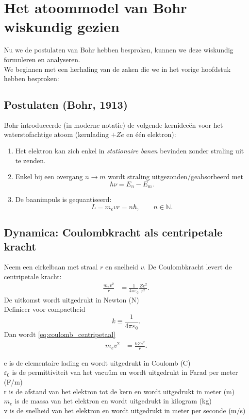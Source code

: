 \documentclass{report} %
\begin{document}
    \chapter{Het atoommodel van Bohr wiskundig gezien}
    Nu we de postulaten van Bohr hebben besproken, kunnen we deze wiskundig formuleren en analyseren. \\
    We beginnen met een herhaling van de zaken die we in het vorige hoofdstuk hebben besproken:


    \section{Postulaten (Bohr, 1913)}
    Bohr introduceerde (in moderne notatie) de volgende kernidee\"en voor het waterstofachtige atoom (kernlading $+Ze$ en \'e\'en elektron):
    \begin{enumerate}
        \item Het elektron kan zich enkel in \emph{stationaire banen} bevinden zonder straling uit te zenden.
        \item Enkel bij een overgang $n\to m$ wordt straling uitgezonden/geabsorbeerd met
        \[
            h\nu = E_n - E_m.
        \]
        \item De baanimpuls is gequantiseerd:
        \[
            L = m_e v r = n\hbar,\qquad n\in\mathbb{N}.
        \]
    \end{enumerate}


    \section{Dynamica: Coulombkracht als centripetale kracht}
    Neem een cirkelbaan met straal $r$ en snelheid $v$. De Coulombkracht levert de centripetale kracht:
    \begin{align}
        \frac{m_e v^2}{r} &= \frac{1}{4\pi\varepsilon_0}\frac{Z e^2}{r^2}.
        \label{eq:coulomb_centripetaal}
    \end{align}
    De uitkomst wordt uitgedrukt in Newton (N)\\

    Definieer voor compactheid
    \[
        k \equiv \frac{1}{4\pi\varepsilon_0}.
    \]
    Dan wordt \eqref{eq:coulomb_centripetaal}
    \begin{align}
        m_e v^2 &= \frac{k Z e^2}{r}.
        \label{eq:mv2}
    \end{align}

    e is de elementaire lading en wordt uitgedrukt in Coulomb (C)\\
    $\varepsilon_0$ is de permittiviteit van het vacuüm en wordt uitgedrukt in Farad per meter (F/m)\\
    r is de afstand van het elektron tot de kern en wordt uitgedrukt in meter (m)\\
    $m_e$ is de massa van het elektron en wordt uitgedrukt in kilogram (kg)\\
    v is de snelheid van het elektron en wordt uitgedrukt in meter per seconde (m/s)\\
\end{document}
